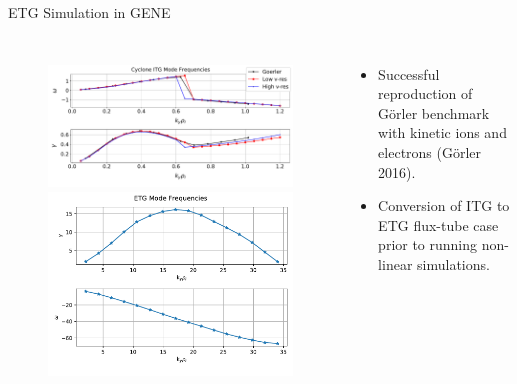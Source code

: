 \documentclass[aspectratio=43]{beamer}
\begin{document}
   \begin{frame}{ETG Simulation in GENE}
      \begin{columns}
         \begin{figure}
            \includegraphics[width=.8\textwidth, height=.35\textheight]{Images/LinearITG_KinEl_GrowthRates.pdf}
            \\
            \includegraphics[width=.8\textwidth, height=.45\textheight]{Images/GrowthRates_ETG.pdf}
         \end{figure}
         \begin{itemize}
            \item Successful reproduction of G\"{o}rler benchmark with kinetic ions and electrons (G\"{o}rler 2016).
            \vspace{10mm}
            \item Conversion of ITG to ETG flux-tube case prior to running non-linear simulations.
         \end{itemize}
      \end{columns}
   \end{frame}
\end{document}

